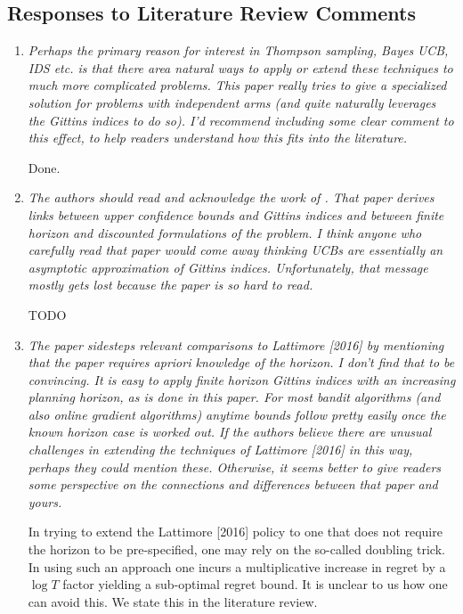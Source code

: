 \documentclass[11pt]{article}
\newcommand{\1}{\ensuremath{\mathbf{1}}} %
\theoremstyle{thm-sf}
\begin{document}
	
	\subsection{Responses to Literature Review Comments}
	
	\begin{enumerate}
		\item {\it Perhaps the primary reason for interest in Thompson sampling, Bayes UCB, IDS etc. is that there area natural ways to apply or extend these techniques to much more complicated problems. This paper really tries to give a specialized solution for problems with independent arms (and quite naturally leverages the Gittins indices to do so). I'd recommend including some clear comment to this effect, to help readers understand how this fits into the literature.}
		
		Done. 
		
		\item {\it The authors should read and acknowledge the work of \citep{chang1987optimal}. That paper derives links between upper confidence bounds and Gittins indices and between finite horizon and discounted formulations of the problem. I think anyone who carefully read that paper would come away thinking UCBs are essentially an asymptotic approximation of Gittins indices. Unfortunately, that message mostly gets lost because the paper is so hard to read.}
		
		TODO
		
		\item {\it The paper sidesteps relevant comparisons to Lattimore [2016] by mentioning that the paper requires apriori knowledge of the horizon. I don't find that to be convincing. It is easy to apply finite horizon Gittins indices with an increasing planning horizon, as is done in this paper. For most bandit algorithms (and also online gradient algorithms) anytime bounds follow pretty easily once the known horizon case is worked out. If the authors believe there are unusual challenges in extending the techniques of Lattimore [2016] in this way, perhaps they could mention these. Otherwise, it seems better to give readers some perspective on the connections and differences between that paper and yours.
		}
		
		In trying to extend the Lattimore [2016] policy to one that does not require the horizon to be pre-specified, one may rely on the so-called doubling trick. In using such an approach one incurs a multiplicative increase in regret by a $\log T$ factor yielding a sub-optimal regret bound. It is unclear to us how one can avoid this. We state this in the literature review. 
		
	\end{enumerate}
	
\end{document}
